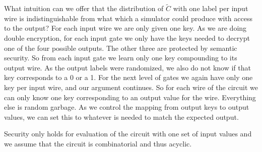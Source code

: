 \documentclass[11pt]{article}
\begin{document}
What intuition can we offer that the 
distribution of $\tilde{C}$ with one label per input wire 
is indistinguishable from what which a simulator could produce with access to the output?
%
For each input wire we are only given one key.
As we are doing double encryption,
for each input gate we only have the keys needed to decrypt one of the four possible outputs.
The other three are protected by semantic security.
%
So from each input gate we learn only one key compounding to its output wire.
As the output labels were randomized, we also do not know if that key corresponds to a 0 or a 1. 
%
For the next level of gates we again have only one key per input wire, and our argument continues. 
%
 So for each wire of the circuit we can only know one key corresponding to an output value for the wire. 
 Everything else is random garbage.
% 
As we control the mapping from output keys to output values, we can set this to whatever is needed to
match the expected output. 


Security only holds for evaluation of the circuit with one set of input values and 
we assume that the circuit is combinatorial and thus acyclic. 

\end{document}
